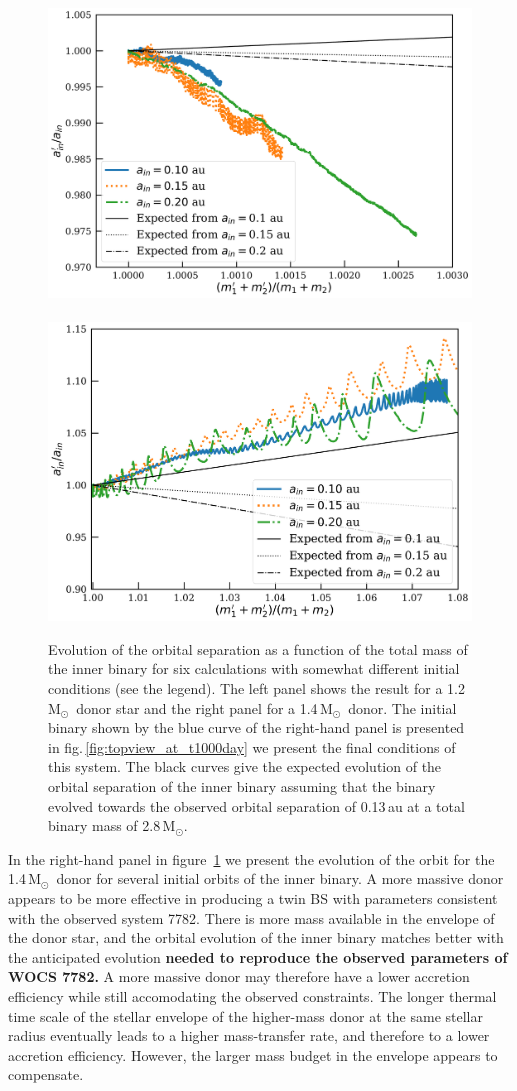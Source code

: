\documentclass[twocolumn]{aastex62}
\newcommand{\MSun}{\mbox{M$_\odot$}}
\begin{document}
\begin{figure}[ht!]
  \includegraphics[width=0.51\linewidth]{fig_orbital_evolution_for_12MSun.pdf}
~  \includegraphics[width=0.49\linewidth]{fig_orbital_evolution_for_14MSun.pdf}
  \caption{Evolution of the orbital separation as a function of the
    total mass of the inner binary for six calculations with somewhat
    different initial conditions (see the legend). The left panel
    shows the result for a 1.2\,\MSun\, donor star and the right panel
    for a 1.4\,\MSun\, donor. The initial binary shown by the blue
    curve of the right-hand panel is presented in
    fig.\,\ref{fig:topview_at_t1000day} we present the final
    conditions of this system.  The black curves give the expected
    evolution of the orbital separation of the inner binary assuming
    that the binary evolved towards the observed orbital separation of
    0.13\,au at a total binary mass of 2.8\,\MSun.
\label{fig:mass_vs_semimajor_axis}}
\end{figure}

In the right-hand panel in figure~\ref{fig:mass_vs_semimajor_axis} we
present the evolution of the orbit for the 1.4\,\MSun\, donor for
several initial orbits of the inner binary. A more massive donor
appears to be more effective in producing a twin BS with parameters
consistent with the observed system 7782. There is more mass available
in the envelope of the donor star, and the orbital evolution of the
inner binary matches better with the anticipated evolution \textbf{needed to reproduce the observed parameters of WOCS 7782.}  A more
massive donor may therefore have a lower accretion efficiency while
still accomodating the observed constraints.  The longer thermal time
scale of the stellar envelope of the higher-mass donor at the same
stellar radius eventually leads to a higher mass-transfer rate, and
therefore to a lower accretion efficiency. However, the larger mass
budget in the envelope appears to compensate.
\end{document}
